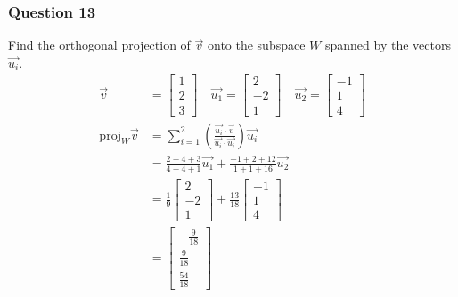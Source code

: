 \documentclass{math}
\begin{document}
\subsubsection*{Question 13}
Find the orthogonal projection of \( \vec{v} \) onto the subspace \( W \)
spanned by the vectors \( \vec{u_i} \).
\begin{align*}
  \vec{v} &= \begin{bmatrix}1 \\ 2 \\ 3\end{bmatrix} \quad
    \vec{u_1} = \begin{bmatrix}2 \\ -2 \\ 1\end{bmatrix} \quad
    \vec{u_2} = \begin{bmatrix}-1 \\ 1 \\ 4\end{bmatrix} \\
  \text{proj}_{W}\vec{v} &= \sum_{i=1}^{2}
    \left(\frac{\vec{u_i}\cdot\vec{v}}{\vec{u_i}\cdot\vec{u_i}}\right)
    \vec{u_i} \\
  &= \frac{2-4+3}{4+4+1}\vec{u_1}+\frac{-1+2+12}{1+1+16}\vec{u_2} \\
  &= \frac{1}{9}\begin{bmatrix}2 \\ -2 \\ 1\end{bmatrix}+
    \frac{13}{18}\begin{bmatrix}-1 \\ 1 \\ 4\end{bmatrix} \\
  &= \begin{bmatrix}-\frac{9}{18} \\ \frac{9}{18} \\ \frac{54}{18}\end{bmatrix}
\end{align*}
\end{document}
